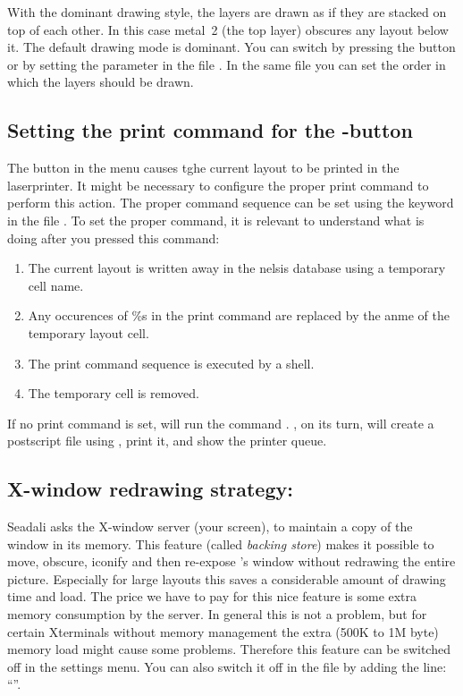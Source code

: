 With the dominant drawing style, the layers are drawn as if they are
stacked on top of each other. In this case metal~2 (the top layer)
obscures any layout below it.  The default drawing mode is dominant.
You can switch by pressing the button  or by setting
the parameter in the file . In the same file you can set the
order in which the layers should be drawn.

\subsection{Setting the print command for the \protect{}-button}
 \label{hardcopy}
The button  in the  menu
causes tghe current layout to be printed in the laserprinter. 
It might be necessary to configure the proper print command to
perform this action. The proper command sequence can be 
set using the keyword  in the file . 
To set the proper command, it is relevant to understand what 
is doing after you pressed this command: 
\begin{enumerate}
\item
The current layout is written away in the nelsis database 
using a temporary cell name.
\item
Any occurences of \%s in the print command are 
replaced by the anme of the temporary layout cell.
\item
The print command sequence is executed by a shell. 
\item
The temporary cell is removed.
\end{enumerate}
If no print command is set,  will run the command .
, on its turn, will create a postscript file using ,
print it, and show the printer queue.

\subsection{X-window redrawing strategy: \protect{}}
Seadali asks the X-window server (your screen), to maintain a copy of the
window in its memory. This feature (called {\em backing store}) makes it
possible to move, obscure, iconify and then re-expose 's window
without redrawing the entire picture. Especially for large layouts this saves a
considerable amount of drawing time and  load. The price we have to
pay for this nice feature is some extra memory consumption by the server. In
general this is not a problem, but for certain Xterminals without memory
management the extra (500K to 1M byte) memory load might cause some problems.
Therefore this feature can be switched off in the settings menu. You can also
switch it off in the file  by adding the line:
``''.

